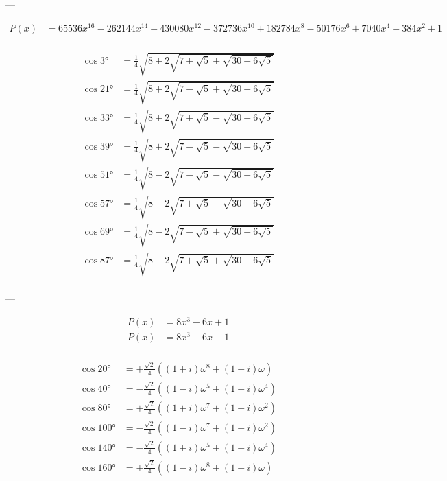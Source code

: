 ---

$$
\begin{aligned}
    P(x) &= 65536 x^{16}-262144 x^{14}+430080 x^{12}-372736 x^{10}+182784 x^8-50176 x^6+7040 x^4-384 x^2+1\\
\end{aligned}
$$

$$
\begin{aligned}
    \cos 3°  &= \frac{1}{4} \sqrt{8+2\sqrt{7+\sqrt{5}+\sqrt{30+6\sqrt{5}}}}\\
    \cos 21° &= \frac{1}{4} \sqrt{8+2\sqrt{7-\sqrt{5}+\sqrt{30-6\sqrt{5}}}}\\
    \cos 33° &= \frac{1}{4} \sqrt{8+2\sqrt{7+\sqrt{5}-\sqrt{30+6\sqrt{5}}}}\\
    \cos 39° &= \frac{1}{4} \sqrt{8+2\sqrt{7-\sqrt{5}-\sqrt{30-6\sqrt{5}}}}\\
    \cos 51° &= \frac{1}{4} \sqrt{8-2\sqrt{7-\sqrt{5}-\sqrt{30-6\sqrt{5}}}}\\
    \cos 57° &= \frac{1}{4} \sqrt{8-2\sqrt{7+\sqrt{5}-\sqrt{30+6\sqrt{5}}}}\\
    \cos 69° &= \frac{1}{4} \sqrt{8-2\sqrt{7-\sqrt{5}+\sqrt{30-6\sqrt{5}}}}\\
    \cos 87° &= \frac{1}{4} \sqrt{8-2\sqrt{7+\sqrt{5}+\sqrt{30+6\sqrt{5}}}}\\
\end{aligned}
$$

---

$$
\begin{aligned}
    P(x) &= 8 x^3-6 x+1\\
    P(x) &= 8 x^3-6 x-1\\
\end{aligned}
$$

$$
\begin{aligned}
    \cos 20°  &= +\frac{\sqrt{2}}{4} \left((1+i)\omega^8+(1-i)\omega\right)\\
    \cos 40°  &= -\frac{\sqrt{2}}{4} \left((1-i)\omega^5+(1+i)\omega^4\right)\\
    \cos 80°  &= +\frac{\sqrt{2}}{4} \left((1+i)\omega^7+(1-i)\omega^2\right)\\
    \cos 100° &= -\frac{\sqrt{2}}{4} \left((1-i)\omega^7+(1+i)\omega^2\right)\\
    \cos 140° &= -\frac{\sqrt{2}}{4} \left((1+i)\omega^5+(1-i)\omega^4\right)\\
    \cos 160° &= +\frac{\sqrt{2}}{4} \left((1-i)\omega^8+(1+i)\omega\right)\\
\end{aligned}
$$

